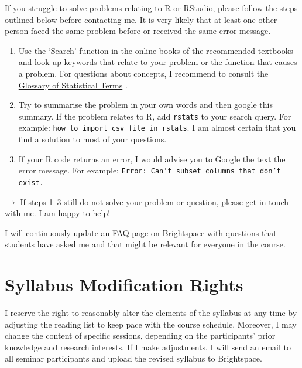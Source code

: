 \documentclass[abstract=on,parskip=full,headings=standardclasses,fontsize=11pt,paper=a4]{scrartcl}
\begin{document}
If you struggle to solve problems relating to \textsf{R} or RStudio, please follow the steps outlined below before contacting me. It is very likely that at least one other person faced the same problem before or received the same error message. %
\begin{enumerate}
\item Use the `Search' function in the online books of the recommended textbooks \autocite{ismay20,wickham17,healy19} and look up keywords that relate to your problem or the function that causes a problem. For questions about concepts, I recommend to consult the \href{https://hbiostat.org/doc/glossary.pdf}{Glossary of Statistical Terms} \autocite{harrell}.
\item Try to summarise the problem in your own words and then google this summary. If the problem relates to \textsf{R}, add \texttt{rstats} to your search query. For example: \texttt{how to import csv file in rstats}. I am almost certain that you find a solution to most of your questions. 
\item If your \textsf{R} code returns an error, I would advise you to Google the text the error message.  For example: \texttt{Error: Can't subset columns that don't exist.}
\end{enumerate}

$\longrightarrow$ If steps 1--3 still do not solve your problem or question, \href{mailto:stefan.mueller@ucd.ie}{please get in touch with me}.  I am happy to help!

I will continuously update an FAQ page on Brightspace with questions that students have asked me and that might be relevant for everyone in the course. 



\section*{Syllabus Modification Rights}

I reserve the right to reasonably alter the elements of the syllabus at any time by adjusting the reading list to keep pace with the course schedule. Moreover, I may change the content of specific sessions, depending on the participants' prior knowledge and research interests. If I make adjustments, I will send an email to all seminar participants and upload the revised syllabus to Brightspace.

\end{document}
